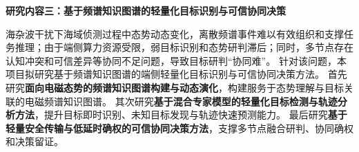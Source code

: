 \textbf{研究内容三：基于频谱知识图谱的轻量化目标识别与可信协同决策}

海杂波干扰下海域侦测过程中态势动态变化，离散频谱事件难以有效组织和支撑任务推理；由于端侧算力资源受限，弱目标识别和态势研判滞后；同时，多节点存在认知冲突和可信差异等协同不足问题，导致目标研判“协同难”。
针对该问题，本项目拟研究基于频谱知识图谱的端侧轻量化目标识别与可信协同决策方法。
首先研究\textbf{面向电磁态势的频谱知识图谱构建与动态演化}，构建服务于态势理解与目标关联的电磁频谱知识图谱。
其次研究\textbf{基于混合专家模型的轻量化目标检测与轨迹分析方法}，提升目标即时识别、未知目标发现与轨迹快速预测能力。
最后研究\textbf{基于轻量安全传输与低延时确权的可信协同决策方法}，支撑多节点融合研判、协同确权和决策留证。





